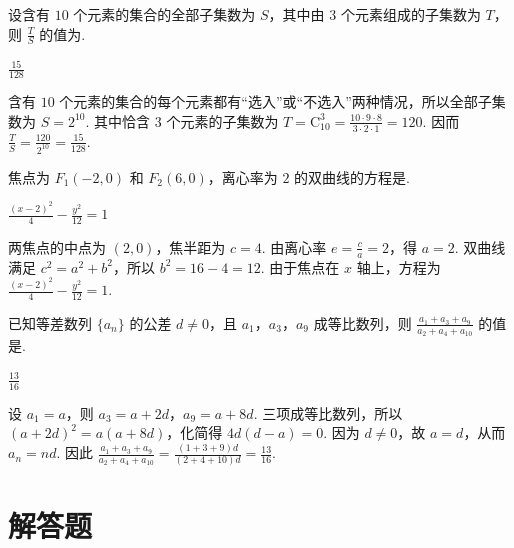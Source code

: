 \begin{problem}
设含有 \(10\) 个元素的集合的全部子集数为 \(S\)，其中由 \(3\) 个元素组成的子集数为 \(T\)，则 \(\frac{T}{S}\) 的值为\fillinblank{}.

\begin{answer}
\(\frac{15}{128}\)
\end{answer}

\begin{solution}
含有 \(10\) 个元素的集合的每个元素都有“选入”或“不选入”两种情况，所以全部子集数为 \(S=2^{10}\). 其中恰含 \(3\) 个元素的子集数为 \(T=\mathrm C_{10}^{3}=\frac{10\cdot9\cdot8}{3\cdot2\cdot1}=120\). 因而 \(\frac{T}{S}=\frac{120}{2^{10}}=\frac{15}{128}\).
\end{solution}
\end{problem}

\begin{problem}
焦点为 \(F_1(-2,0)\) 和 \(F_2(6,0)\)，离心率为 \(2\) 的双曲线的方程是\fillinblank{}.

\begin{answer}
\(\frac{(x-2)^2}{4}-\frac{y^2}{12}=1\)
\end{answer}

\begin{solution}
两焦点的中点为 \((2,0)\)，焦半距为 \(c=4\). 由离心率 \(e=\frac{c}{a}=2\)，得 \(a=2\). 双曲线满足 \(c^2=a^2+b^2\)，所以 \(b^2=16-4=12\). 由于焦点在 \(x\) 轴上，方程为 \(\frac{(x-2)^2}{4}-\frac{y^2}{12}=1\).
\end{solution}
\end{problem}

\begin{problem}
已知等差数列 \(\{a_n\}\) 的公差 \(d\neq 0\)，且 \(a_1\)，\(a_3\)，\(a_9\) 成等比数列，则 \(\frac{a_1+a_3+a_9}{a_2+a_4+a_{10}}\) 的值是\fillinblank{}.

\begin{answer}
\(\frac{13}{16}\)
\end{answer}

\begin{solution}
设 \(a_1=a\)，则 \(a_3=a+2d\)，\(a_9=a+8d\). 三项成等比数列，所以 \((a+2d)^2=a(a+8d)\)，化简得 \(4d(d-a)=0\). 因为 \(d\neq0\)，故 \(a=d\)，从而 \(a_n=nd\). 因此
\(\frac{a_1+a_3+a_9}{a_2+a_4+a_{10}}=\frac{(1+3+9)d}{(2+4+10)d}=\frac{13}{16}\).
\end{solution}
\end{problem}

\section{解答题}

